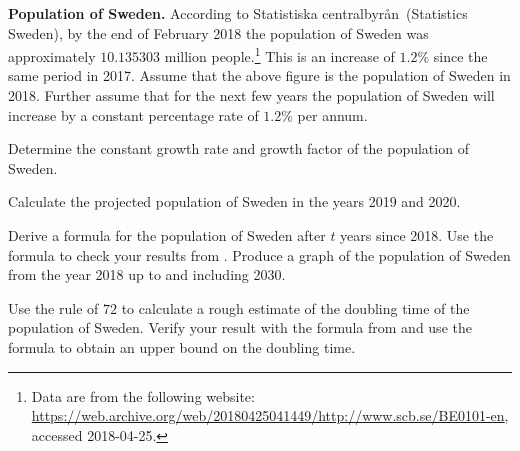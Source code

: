 \documentclass[a4paper,oneside,12pt]{article}
\begin{document}
\begin{exercise}
\textbf{Population of Sweden.}
According to Statistiska centralbyr{\aa}n~(Statistics Sweden), by the
end of February 2018 the population of Sweden was approximately
$10.135303$ million people.\footnote{
  Data are from the following website:
  \url{https://web.archive.org/web/20180425041449/http://www.scb.se/BE0101-en},
  accessed 2018-04-25.
}
This is an increase of $1.2\%$ since the same period in 2017.  Assume
that the above figure is the population of Sweden in 2018.  Further
assume that for the next few years the population of Sweden will
increase by a constant percentage rate of $1.2\%$ per annum.
\begin{packedenum}
\item\label{subex:Sweden_population_growth_rate_factor}
  Determine the constant growth rate and growth factor of the
  population of Sweden.

\item\label{subex:Sweden_population_2019_2020}
  Calculate the projected population of Sweden in the years 2019 and
  2020.

\item\label{subex:Sweden_population_formula_graph}
  Derive a formula for the population of Sweden after $t$ years since
  2018.  Use the formula to check your results
  from .  Produce a graph of
  the population of Sweden from the year 2018 up to and including
  2030.

\item\label{subex:Sweden_population_doubling_time}
  Use the rule of $72$ to calculate a rough estimate of the doubling
  time of the population of Sweden.  Verify your result with the
  formula from  and use
  the formula to obtain an upper bound on the doubling time.
\end{packedenum}
\end{exercise}
\end{document}
